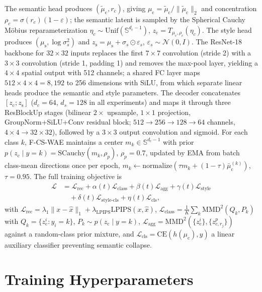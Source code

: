 \documentclass[10pt,letterpaper]{article}
\newcommand{\ours}{F-CS-WAE}
\newcommand{\zc}{z_{\mathrm{c}}}
\newcommand{\zs}{z_{\mathrm{s}}}
\newcommand{\muc}{\mu_{\mathrm{c}}}
\newcommand{\mus}{\mu_{\mathrm{s}}}
\newcommand{\Sph}{\mathbb{S}}
\newcommand{\MMD}{\mathrm{MMD}}
\newcommand{\CE}{\mathrm{CE}}
\newcommand{\SCauchy}{\mathrm{SCauchy}}
\begin{document}
The semantic head produces $(\tilde\muc,r_c)$, giving
$\muc=\tilde\muc/\|\tilde\muc\|_2$ and concentration
$\rho_c=\sigma(r_c)(1-\varepsilon)$; the semantic latent is sampled by the
Spherical Cauchy M\"obius reparameterization $\eta_c\sim\mathrm{Unif}(\Sph^{d_c-1})$,
$\zc=T_{\muc,\rho_c}(\eta_c)$. The style head produces $(\mus,\log\sigma_s^2)$
and $\zs=\mus+\sigma_s\odot\varepsilon_s$, $\varepsilon_s\sim\mathcal N(0,I)$.
The ResNet-18 backbone for $32\times32$ inputs replaces the first
$7\times7$ convolution (stride 2) with a $3\times3$ convolution (stride 1,
padding 1) and removes the max-pool layer, yielding a $4\times4$ spatial
output with 512 channels; a shared FC layer maps
$512\times4\times4{=}8{,}192$ to 256 dimensions with SiLU, from which
separate linear heads produce the semantic and style parameters. The
decoder concatenates $[\zc;\zs]$ ($d_c{=}64$, $d_s{=}128$ in all
experiments) and maps it through three ResBlockUp stages (bilinear
$2\times$ upsample, $1\times1$ projection, GroupNorm+SiLU+Conv residual
block; $512{\to}256{\to}128{\to}64$ channels, $4\times4\to32\times32$),
followed by a $3\times3$ output convolution and sigmoid. For each class
$k$, \ours{} maintains a center $m_k\in\Sph^{d_c-1}$ with prior
$p(\zc\mid y{=}k)=\SCauchy(m_k,\rho_p)$, $\rho_p{=}0.7$, updated by EMA from
batch class-mean directions once per epoch,
$m_k\leftarrow\mathrm{normalize}(\tau m_k+(1-\tau)\bar\muc^{(k)})$,
$\tau{=}0.95$. The full training objective is
\begin{align}
  \mathcal{L} &= \mathcal{L}_{\mathrm{rec}} + \alpha(t)\mathcal{L}_{\mathrm{class}}
   + \beta(t)\mathcal{L}_{\mathrm{agg}} + \gamma(t)\mathcal{L}_{\mathrm{style}} \nonumber\\
  &\quad + \delta(t)\mathcal{L}_{\mathrm{style\text{-}cls}} + \eta(t)\mathcal{L}_{\mathrm{cls}},
\end{align}
with $\mathcal{L}_{\mathrm{rec}}=\lambda_1\|x-\hat x\|_1+\lambda_{\mathrm{LPIPS}}\mathrm{LPIPS}(x,\hat x)$,
$\mathcal{L}_{\mathrm{class}}=\frac1K\sum_k\MMD^2(Q_k,P_k)$ with
$Q_k=\{\zc^i{:}y_i{=}k\}$, $P_k\sim p(\zc\mid y{=}k)$,
$\mathcal{L}_{\mathrm{agg}}=\MMD^2(\{\zc^i\},\{z_{c,r_j}^p\})$ against a
random-class prior mixture, and $\mathcal{L}_{\mathrm{cls}}=\CE(h(\muc),y)$
a linear auxiliary classifier preventing semantic collapse.

\section{Training Hyperparameters}
\label{app:training}
\end{document}
